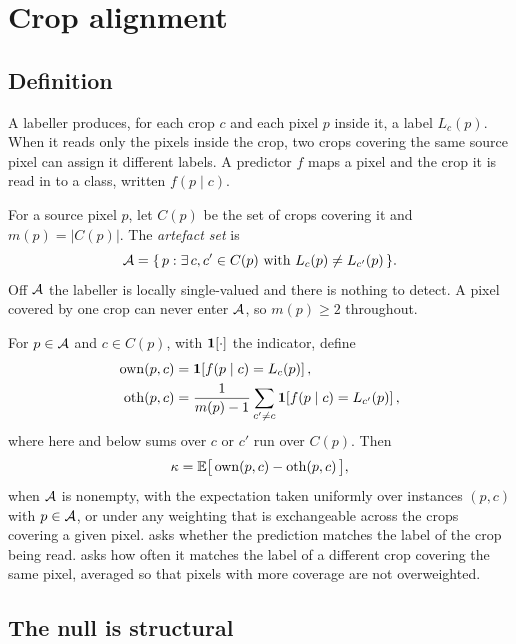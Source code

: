 \section{Crop alignment}
\label{sec:kappa}

\subsection{Definition}

A labeller produces, for each crop $c$ and each pixel $p$ inside it, a label
$L_c(p)$. When it reads only the pixels inside the crop, two crops covering the same
source pixel can assign it different labels. A predictor $f$ maps a pixel and the
crop it is read in to a class, written $f(p \mid c)$.

For a source pixel $p$, let $C(p)$ be the set of crops covering it and
$m(p) = |C(p)|$. The \emph{artefact set} is
\begin{equation}
\mathcal{A} = \{\, p : \exists\, c, c' \in C(p) \text{ with } L_c(p) \neq L_{c'}(p) \,\}.
\label{eq:aset}
\end{equation}
Off $\mathcal{A}$ the labeller is locally single-valued and there is nothing to detect. A
pixel covered by one crop can never enter $\mathcal{A}$, so $m(p) \geq 2$ throughout.

For $p \in \mathcal{A}$ and $c \in C(p)$, with $\mathbf{1}\!\left[ \cdot \right]$ the indicator, define
\begin{align}
\mathrm{own}(p,c) &= \mathbf{1}\!\left[ f(p \mid c) = L_c(p) \right], \label{eq:own}\\
\mathrm{oth}(p,c) &= \frac{1}{m(p)-1} \sum_{c' \neq c} \mathbf{1}\!\left[ f(p \mid c) = L_{c'}(p) \right],
\label{eq:oth}
\end{align}
where here and below sums over $c$ or $c'$ run over $C(p)$. Then
\begin{equation}
\kappa = \mathbb{E}\big[\, \mathrm{own}(p,c) - \mathrm{oth}(p,c) \,\big],
\label{eq:kappa}
\end{equation}
when $\mathcal{A}$ is nonempty, with the expectation taken uniformly over instances $(p,c)$
with $p \in \mathcal{A}$, or under
any weighting that is exchangeable across the crops covering a given pixel.
 asks whether the prediction matches the label of the crop being read.
 asks how often it matches the label of a different crop covering the
same pixel, averaged so that pixels with more coverage are not overweighted.

\subsection{The null is structural}

